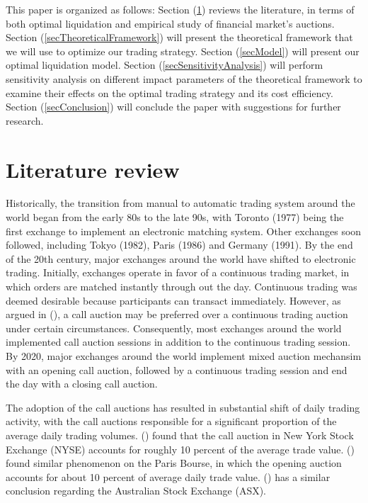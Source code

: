 \documentclass{article}
\begin{document}
This paper is organized as follows: Section (\ref{secReview}) reviews the literature, in terms of both optimal liquidation and empirical study of financial market's auctions. Section (\ref{secTheoreticalFramework}) will present the theoretical framework that we will use to optimize our trading strategy. Section (\ref{secModel}) will present our optimal liquidation model. Section (\ref{secSensitivityAnalysis}) will perform sensitivity analysis on different impact parameters of the theoretical framework to examine their effects on the optimal trading strategy and its cost efficiency. Section (\ref{secConclusion}) will conclude the paper with suggestions for further research.

\section{Literature review}\label{secReview}

Historically, the transition from manual to automatic trading system around the world began from the early 80s to the late 90s, with Toronto (1977) being the first exchange to implement an electronic matching system. Other exchanges soon followed, including Tokyo (1982), Paris (1986) and Germany (1991). By the end of the 20th century, major exchanges around the world have shifted to electronic trading. Initially, exchanges operate in favor of a continuous trading market, in which orders are matched instantly through out the day. Continuous trading was deemed desirable because participants can transact immediately. However, as argued in (\cite{Economides1995}), a call auction may be preferred over a continuous trading auction under certain circumstances. Consequently, most exchanges around the world implemented call auction sessions in addition to the continuous trading session. By 2020, major exchanges around the world implement mixed auction mechansim with an opening call auction, followed by a continuous trading session and end the day with a closing call auction.

The adoption of the call auctions has resulted in substantial shift of daily trading activity, with the call auctions responsible for a significant proportion of the average daily trading volumes. (\cite{Madhavan2015}) found that the call auction in New York Stock Exchange (NYSE) accounts for roughly 10 percent of the average trade value. (\cite{Bruno1999}) found similar phenomenon on the Paris Bourse, in which the opening auction accounts for about 10 percent of average daily trade value. (\cite{Carole2006}) has a similar conclusion regarding the Australian Stock Exchange (ASX).
\end{document}
